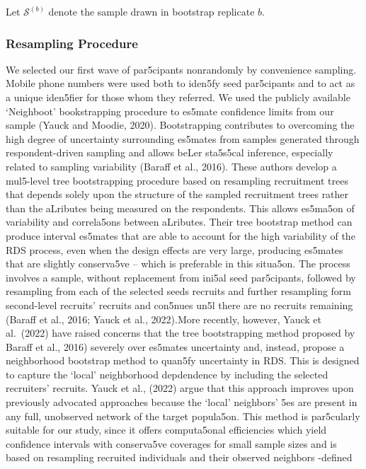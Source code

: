 \documentclass[
  12pt,
  letterpaper,
  DIV=11,
  numbers=noendperiod]{scrartcl}
\theoremstyle{plain}
\theoremstyle{definition}
\begin{document}
Let \(\mathcal{S}^{(b)}\) denote the sample drawn in bootstrap replicate
\(b\).

\subsubsection{Resampling Procedure}\label{resampling-procedure}

We selected our first wave of par5cipants nonrandomly by convenience
sampling. Mobile phone numbers were used both to iden5fy seed
par5cipants and to act as a unique iden5fier for those whom they
referred. We used the publicly available `Neighboot' bookstrapping
procedure to es5mate confidence limits from our sample (Yauck and
Moodie, 2020). Bootstrapping contributes to overcoming the high degree
of uncertainty surrounding es5mates from samples generated through
respondent-driven sampling and allows beLer sta5s5cal inference,
especially related to sampling variability (Baraﬀ et al., 2016). These
authors develop a mul5-level tree bootstrapping procedure based on
resampling recruitment trees that depends solely upon the structure of
the sampled recruitment trees rather than the aLributes being measured
on the respondents. This allows es5ma5on of variability and correla5ons
between aLributes. Their tree bootstrap method can produce interval
es5mates that are able to account for the high variability of the RDS
process, even when the design eﬀects are very large, producing es5mates
that are slightly conserva5ve -- which is preferable in this situa5on.
The process involves a sample, without replacement from ini5al seed
par5cipants, followed by resampling from each of the selected seeds
recruits and further resampling form second-level recruits' recruits and
con5nues un5l there are no recruits remaining (Baraﬀ et al., 2016; Yauck
et al., 2022).More recently, however, Yauck et al.~(2022) have raised
concerns that the tree bootstrapping method proposed by Baraﬀ et al.,
2016) severely over es5mates uncertainty and, instead, propose a
neighborhood bootstrap method to quan5fy uncertainty in RDS. This is
designed to capture the `local' neighborhood depdendence by including
the selected recruiters' recruits. Yauck et al., (2022) argue that this
approach improves upon previously advocated approaches because the
`local' neighbors' 5es are present in any full, unobserved network of
the target popula5on. This method is par5cularly suitable for our study,
since it oﬀers computa5onal eﬃciencies which yield confidence intervals
with conserva5ve coverages for small sample sizes and is based on
resampling recruited individuals and their observed neighbors -defined
\end{document}
